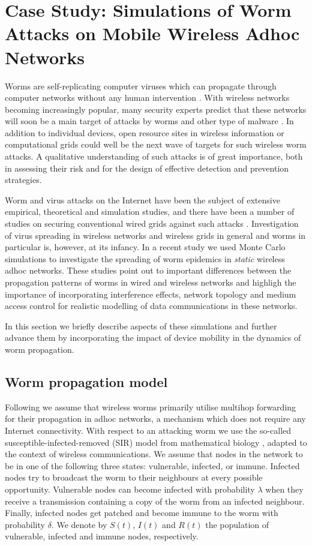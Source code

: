 \documentclass{elsart}
\begin{document}
\section{Case Study: Simulations of Worm Attacks on Mobile 
Wireless Adhoc Networks}
Worms are self-replicating computer viruses which can propagate through 
computer networks without any human intervention \cite{book-virus}.
With wireless networks becoming increasingly popular, many 
security experts predict that these networks will soon be a main 
target of attacks by worms and other type of malware \cite{sci-am,nature}.
In addition to individual devices, open resource sites in wireless information 
or computational grids could well be the next wave of targets for such 
wireless worm attacks. A qualitative understanding of such attacks is of great 
importance, both in assessing their risk and for the 
design of effective detection and prevention strategies. 

Worm and virus attacks on the Internet have been the subject of extensive 
empirical, theoretical and simulation studies, and there have been a 
number of studies on securing  conventional wired grids against such  attacks
\cite{wisec}.  Investigation of virus spreading in 
wireless networks and wireless grids in general and worms 
in particular is, however, at its infancy. 
In a recent study \cite{maziar-worms} 
we used Monte Carlo simulations to investigate 
the spreading of worm epidemics in {\it static} wireless adhoc networks.
These studies point out to important differences 
between the propagation patterns of worms in wired and wireless networks
and highligh the importance of incorporating interference effects, 
network topology and medium access control for realistic 
modelling of data communications in these networks.

In this section we briefly describe aspects of these simulations 
and further advance them by incorporating the impact of device 
mobility in the dynamics of worm propagation. 

\subsection{Worm propagation model}
Following \cite{maziar-worms} we assume that wireless 
worms primarily utilise multihop forwarding for their propagation in adhoc
 networks, a mechanism which does not require any Internet connectivity.  
With respect to an attacking  worm we use the so-called 
susceptible-infected-removed (SIR) model from mathematical 
biology \cite{bio}, adapted to the context of wireless communications.
We assume that nodes in the network to 
be in one of the  following three states: vulnerable,
infected, or  immune. Infected nodes try to broadcast the worm to their
neighbours at every possible opportunity.
Vulnerable nodes can become infected with probability  
$\lambda$ when they receive a transmission containing a
copy  of the worm  from an infected neighbour. Finally, infected 
nodes get patched and become immune to the worm with 
probability  $\delta$. We denote by $S(t)$, $I(t)$ and $R(t)$ the 
population of vulnerable, infected and immune nodes, respectively.
\end{document}
